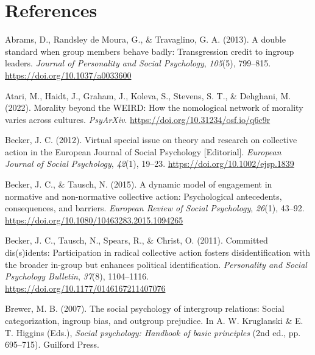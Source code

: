 \documentclass[12pt, letterpaper]{article}
\newcommand{\refsection}{\newpage \section{References}}
\newenvironment{CSLReferences}[2]{}{}
\begin{document}
\refsection

\begingroup

\noindent \setlength{\parindent}{-0.5in} \setlength{\leftskip}{0.5in}
\small

\hypertarget{refs}{}
\begin{CSLReferences}{1}{0}
\leavevmode{}%
Abrams, D., Randsley de Moura, G., \& Travaglino, G. A. (2013). A double
standard when group members behave badly: {Transgression} credit to
ingroup leaders. \emph{Journal of Personality and Social Psychology},
\emph{105}(5), 799--815. \url{https://doi.org/10.1037/a0033600}

\leavevmode{}%
Atari, M., Haidt, J., Graham, J., Koleva, S., Stevens, S. T., \&
Dehghani, M. (2022). Morality beyond the {WEIRD}: How the nomological
network of morality varies across cultures. \emph{PsyArXiv}.
\url{https://doi.org/10.31234/osf.io/q6c9r}

\leavevmode{}%
Becker, J. C. (2012). Virtual special issue on theory and research on
collective action in the {European} {Journal} of {Social} {Psychology}
{[}{Editorial}{]}. \emph{European Journal of Social Psychology},
\emph{42}(1), 19--23. \url{https://doi.org/10.1002/ejsp.1839}

\leavevmode{}%
Becker, J. C., \& Tausch, N. (2015). A dynamic model of engagement in
normative and non-normative collective action: {Psychological}
antecedents, consequences, and barriers. \emph{European Review of Social
Psychology}, \emph{26}(1), 43--92.
\url{https://doi.org/10.1080/10463283.2015.1094265}

\leavevmode{}%
Becker, J. C., Tausch, N., Spears, R., \& Christ, O. (2011). Committed
dis(s)idents: {Participation} in radical collective action fosters
disidentification with the broader in-group but enhances political
identification. \emph{Personality and Social Psychology Bulletin},
\emph{37}(8), 1104--1116. \url{https://doi.org/10.1177/0146167211407076}

\leavevmode{}%
Brewer, M. B. (2007). The social psychology of intergroup relations:
Social categorization, ingroup bias, and outgroup prejudice. In A. W.
Kruglanski \& E. T. Higgins (Eds.), \emph{Social psychology: Handbook of
basic principles} (2nd ed., pp. 695--715). Guilford Press.


\end{CSLReferences}
\end{document}
